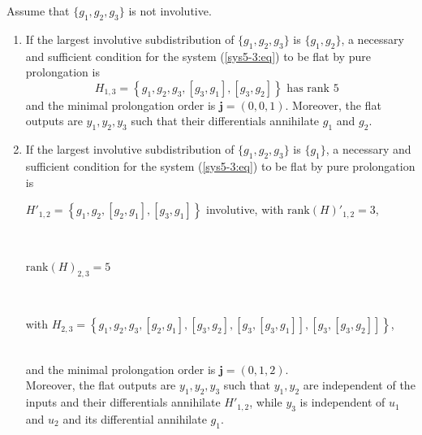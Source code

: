\documentclass[10pt,a4paper]{amsart}
\newcommand{\mbf}[1]{\mathbf{#1}}
\newcommand{\rk}[1]{\mathrm{rank} \left(#1\right)}
\begin{document}
\begin{thm}
\label{3-5theorem}
Assume that $\{g_1,g_2,g_3\}$ is not involutive.

\begin{enumerate}
  \item If the largest involutive subdistribution of $\{g_1,g_2,g_3\}$ is $\{g_1,g_2\}$, a necessary and sufficient condition for the system (\ref{sys5-3:eq}) to be flat by pure prolongation is
      \[ H_{1,3}=\left\{g_1,g_2,g_3,[g_{3},g_{1}], [g_{3},g_{2}]\right\} \mbox{ has rank $5$ } \]
      and the minimal prolongation  order is $\mbf{j}= (0,0,1)$. Moreover, the flat outputs are $y_1,y_2,y_3$ such that their differentials annihilate $g_1$ and $g_2$.
  \item If the largest involutive subdistribution of $\{g_1,g_2,g_3\}$ is $\{g_1\}$, a necessary and sufficient condition for the system (\ref{sys5-3:eq}) to be flat by pure prolongation is \\
\centerline{$H'_{1,2} =  \left\{g_{1}, g_{2}, [g_{2},g_{1}], [g_{3},g_{1}]\right\}$ involutive, with $\rk H' _{1,2} = 3$,}\\
\centerline{$\rk H_{2,3} = 5$}\\
\centerline{ with $H_{2,3} = \left\{g_{1}, g_{2}, g_{3}, [g_{2},g_{1}], [g_{3},g_{2}], [g_{3},[g_{3},g_{1}]], [g_{3},[g_{3},g_{2}]] \right\}$,}\\
 and the minimal prolongation order is $\mbf{j}= (0,1,2)$. \\
 Moreover, the flat outputs are $y_1,y_2,y_3$ such that $y_1,y_2$ are independent of the inputs and their differentials annihilate $H'_{1,2}$, while $y_3$ is independent of $u_1$ and $u_2$ and its differential annihilate $g_1$.
\end{enumerate}
\end{thm}
\end{document}
